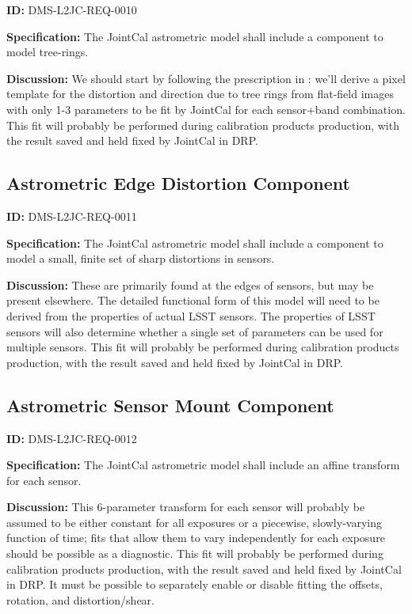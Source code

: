 \documentclass[SE,toc,lsstdraft]{lsstdoc}
\begin{document}
\label{DMS-L2JC-REQ-0010}
\textbf{ID:} DMS-L2JC-REQ-0010

\textbf{Specification:}
The JointCal astrometric model shall include a component to model tree-rings.

\textbf{Discussion:}
We should start by following the prescription in \citep{2017PASP..129g4503B}: we'll derive a pixel template for the distortion and direction due to tree rings from flat-field images with only 1-3 parameters to be fit by JointCal for each sensor+band combination.  This fit will probably be performed during calibration products production, with the result saved and held fixed by JointCal in DRP.

\subsection{Astrometric Edge Distortion Component}

\label{DMS-L2JC-REQ-0011}
\textbf{ID:} DMS-L2JC-REQ-0011

\textbf{Specification:}
The JointCal astrometric model shall include a component to model a small, finite set of sharp distortions in sensors.

\textbf{Discussion:}
These are primarily found at the edges of sensors, but may be present elsewhere.  The detailed functional form of this model will need to be derived from the properties of actual LSST sensors.  The properties of LSST sensors will also determine whether a single set of parameters can be used for multiple sensors.  This fit will probably be performed during calibration products production, with the result saved and held fixed by JointCal in DRP.

\subsection{Astrometric Sensor Mount Component}

\label{DMS-L2JC-REQ-0012}
\textbf{ID:} DMS-L2JC-REQ-0012

\textbf{Specification:}
The JointCal astrometric model shall include an affine transform for each sensor.

\textbf{Discussion:}
This 6-parameter transform for each sensor will probably be assumed to be either constant for all exposures or a piecewise, slowly-varying function of time; fits that allow them to vary independently for each exposure should be possible as a diagnostic.  This fit will probably be performed during calibration products production, with the result saved and held fixed by JointCal in DRP.  It must be possible to separately enable or disable fitting the offsets, rotation, and distortion/shear.
\end{document}
